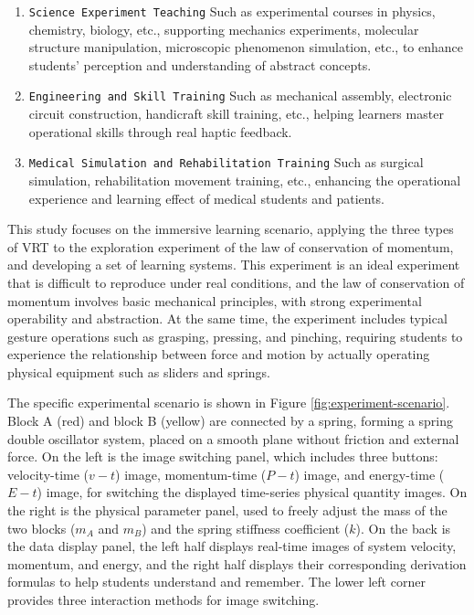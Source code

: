 \documentclass[runningheads]{llncs}
\begin{document}
\begin{enumerate}[label={\arabic*)}]
  \item \texttt{Science Experiment Teaching} Such as experimental courses in physics, chemistry, biology, etc., supporting mechanics experiments, molecular structure manipulation, microscopic phenomenon simulation, etc., to enhance students' perception and understanding of abstract concepts.
  \item \texttt{Engineering and Skill Training} Such as mechanical assembly, electronic circuit construction, handicraft skill training, etc., helping learners master operational skills through real haptic feedback.
  \item \texttt{Medical Simulation and Rehabilitation Training} Such as surgical simulation, rehabilitation movement training, etc., enhancing the operational experience and learning effect of medical students and patients.
\end{enumerate}

This study focuses on the immersive learning scenario, applying the three types of VRT to the exploration experiment of the law of conservation of momentum, and developing a set of learning systems. This experiment is an ideal experiment that is difficult to reproduce under real conditions, and the law of conservation of momentum involves basic mechanical principles, with strong experimental operability and abstraction. At the same time, the experiment includes typical gesture operations such as grasping, pressing, and pinching, requiring students to experience the relationship between force and motion by actually operating physical equipment such as sliders and springs.

The specific experimental scenario is shown in Figure \ref{fig:experiment-scenario}. Block A (red) and block B (yellow) are connected by a spring, forming a spring double oscillator system, placed on a smooth plane without friction and external force. On the left is the image switching panel, which includes three buttons: velocity-time (\(v-t\)) image, momentum-time (\(P-t\)) image, and energy-time (\(E-t\)) image, for switching the displayed time-series physical quantity images. On the right is the physical parameter panel, used to freely adjust the mass of the two blocks (\(m_A\) and \(m_B\)) and the spring stiffness coefficient (\(k\)). On the back is the data display panel, the left half displays real-time images of system velocity, momentum, and energy, and the right half displays their corresponding derivation formulas to help students understand and remember. The lower left corner provides three interaction methods for image switching.
\end{document}
